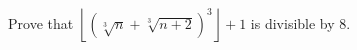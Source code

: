 Prove that $\left\lfloor \left(\sqrt[3]{n} + \sqrt[3]{n + 2}\right)^3 \right\rfloor + 1$ is divisible by $8$.
